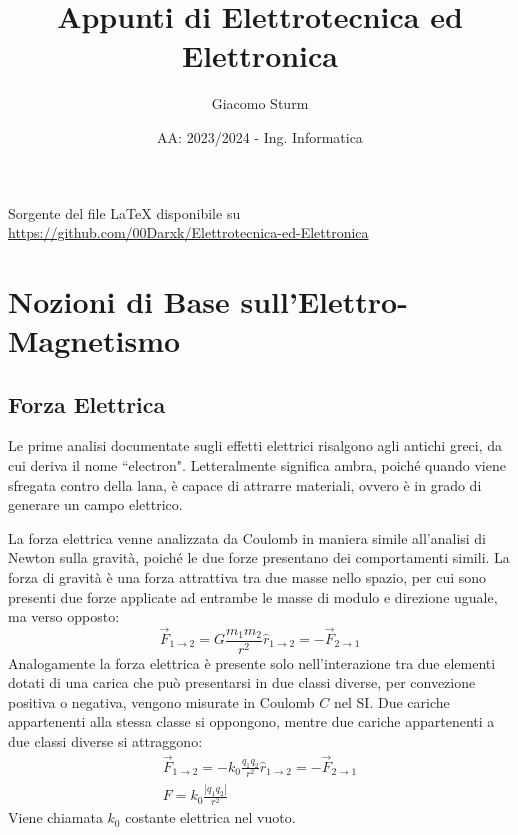 \documentclass{article}
\numberwithin{equation}{subsection}
\begin{document}
\title{Appunti di Elettrotecnica ed Elettronica}
\author{Giacomo Sturm}
\date{AA: 2023/2024 - Ing. Informatica}



\pagestyle{fancy}
\fancyhead{}\fancyfoot{}
\fancyfoot[C]{\thepage}

\maketitle

\vspace{10mm}

\begin{center}
    Sorgente del file LaTeX disponibile su \url{https://github.com/00Darxk/Elettrotecnica-ed-Elettronica}
\end{center}

\clearpage

\tableofcontents



\clearpage


\section{Nozioni di Base sull'Elettro-Magnetismo}

\subsection{Forza Elettrica}
Le prime analisi documentate sugli effetti elettrici risalgono agli antichi greci, da cui deriva il nome ``electron". %
Letteralmente significa ambra, poiché 
quando viene sfregata contro della lana, è capace di attrarre materiali, ovvero è in grado di generare un campo elettrico.

La forza elettrica venne analizzata da Coulomb in maniera simile all'analisi di Newton sulla gravità, poiché le due forze presentano dei comportamenti simili. La forza di 
gravità è una forza attrattiva tra due masse nello spazio, per cui sono presenti due forze applicate ad entrambe le masse di modulo e direzione uguale, ma verso opposto: 
\begin{equation*}
    \vec{F}_{1\to2}=G\displaystyle\frac{m_1m_2}{r^2}\hat{r}_{1\to2}=-\vec{F}_{2\to1}
\end{equation*}
Analogamente la forza elettrica è presente solo nell'interazione tra due elementi dotati di una carica che può presentarsi in due classi diverse, per convezione 
positiva o negativa, vengono misurate in Coulomb $C$ nel SI. Due cariche appartenenti alla stessa classe si oppongono, mentre due cariche appartenenti a due classi diverse 
si attraggono:
\begin{gather}
    \vec{F}_{1\to2}=-k_0\displaystyle\frac{q_1q_2}{r^2}\hat{r}_{1\to2}=-\vec{F}_{2\to1}\\
    F=k_0\displaystyle\frac{|q_1q_2|}{r^2}
\end{gather} 
Viene chiamata $k_0$ costante elettrica nel vuoto. 
\end{document}
